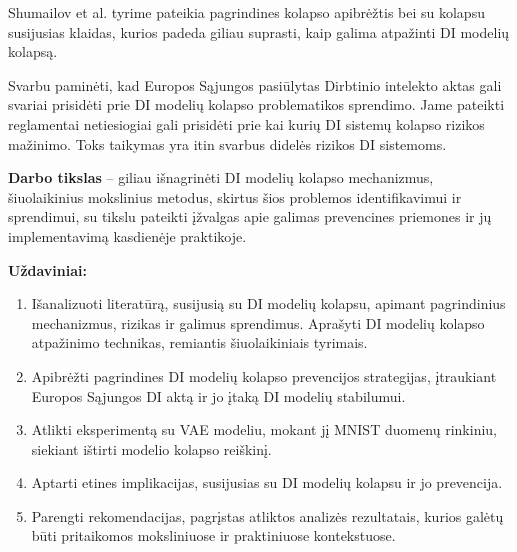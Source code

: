 \documentclass{VUMIFInfKursinis}
\begin{document}

Shumailov et al. tyrime \cite{AICollapseNature} pateikia pagrindines kolapso apibrėžtis bei su kolapsu susijusias klaidas, kurios padeda giliau suprasti, kaip galima atpažinti DI modelių kolapsą.

Svarbu paminėti, kad Europos Sąjungos pasiūlytas Dirbtinio intelekto aktas \cite{AIEuropeanAct} gali svariai prisidėti prie DI modelių kolapso problematikos sprendimo. Jame pateikti reglamentai netiesiogiai gali prisidėti prie kai kurių DI sistemų kolapso rizikos mažinimo. Toks taikymas yra itin svarbus didelės rizikos DI sistemoms.




\textbf{Darbo tikslas} – giliau išnagrinėti DI modelių kolapso mechanizmus,  šiuolaikinius mokslinius metodus, skirtus šios problemos identifikavimui ir sprendimui, su tikslu pateikti įžvalgas apie galimas prevencines priemones ir jų implementavimą kasdienėje praktikoje.

\textbf{Uždaviniai:}
\begin{enumerate}
    \item Išanalizuoti literatūrą, susijusią su DI modelių kolapsu, apimant pagrindinius mechanizmus, rizikas ir galimus sprendimus. Aprašyti DI modelių kolapso atpažinimo technikas, remiantis šiuolaikiniais tyrimais.
    \item Apibrėžti pagrindines DI modelių kolapso prevencijos strategijas, įtraukiant Europos Sąjungos DI aktą ir jo įtaką DI modelių stabilumui.
    \item Atlikti eksperimentą su VAE modeliu, mokant jį MNIST duomenų rinkiniu, siekiant ištirti modelio kolapso reiškinį.
    \item Aptarti etines implikacijas, susijusias su DI modelių kolapsu ir jo prevencija.
    \item Parengti rekomendacijas, pagrįstas atliktos analizės rezultatais, kurios galėtų būti pritaikomos moksliniuose ir praktiniuose kontekstuose.
\end{enumerate}
\end{document}
